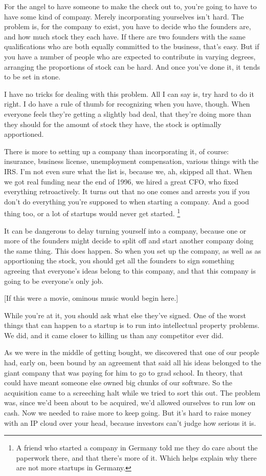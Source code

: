 \documentclass[12pt]{book}
\begin{document}
For the angel to have someone to make the check out to, you're going to
have to have some kind of company. Merely incorporating yourselves isn't
hard. The problem is, for the company to exist, you have to decide who
the founders are, and how much stock they each have. If there are two
founders with the same qualifications who are both equally committed to
the business, that's easy. But if you have a number of people who are
expected to contribute in varying degrees, arranging the proportions of
stock can be hard. And once you've done it, it tends to be set in stone.

I have no tricks for dealing with this problem. All I can say is, try
hard to do it right. I do have a rule of thumb for recognizing when you
have, though. When everyone feels they're getting a slightly bad deal,
that they're doing more than they should for the amount of stock they
have, the stock is optimally apportioned.

There is more to setting up a company than incorporating it, of course:
insurance, business license, unemployment compensation, various things
with the IRS. I'm not even sure what the list is, because we, ah,
skipped all that. When we got real funding near the end of 1996, we
hired a great CFO, who fixed everything retroactively. It turns out that
no one comes and arrests you if you don't do everything you're supposed
to when starting a company. And a good thing too, or a lot of startups
would never get started. \footnote{A friend who started a company in Germany told me they do care
about the paperwork there, and that there's more of it. Which helps
explain why there are not more startups in Germany.}

It can be dangerous to delay turning yourself into a company, because
one or more of the founders might decide to split off and start another
company doing the same thing. This does happen. So when you set up the
company, as well as as apportioning the stock, you should get all the
founders to sign something agreeing that everyone's ideas belong to this
company, and that this company is going to be everyone's only job.

{[}If this were a movie, ominous music would begin here.{]}

While you're at it, you should ask what else they've signed. One of the
worst things that can happen to a startup is to run into intellectual
property problems. We did, and it came closer to killing us than any
competitor ever did.

As we were in the middle of getting bought, we discovered that one of
our people had, early on, been bound by an agreement that said all his
ideas belonged to the giant company that was paying for him to go to
grad school. In theory, that could have meant someone else owned big
chunks of our software. So the acquisition came to a screeching halt
while we tried to sort this out. The problem was, since we'd been about
to be acquired, we'd allowed ourselves to run low on cash. Now we needed
to raise more to keep going. But it's hard to raise money with an IP
cloud over your head, because investors can't judge how serious it is.
\end{document}
